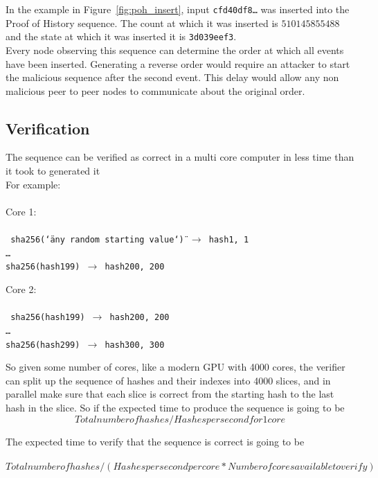 \documentclass[12pt]{article}
\begin{document}
  In the example in Figure~\ref{fig:poh_insert}, input \texttt{cfd40df8\ldots} was inserted into the Proof of History sequence. The count at which it was inserted is $510145855488$ and the state at which it was inserted it is \texttt{3d039eef3}.\\

Every node observing this sequence can determine the order at which all events have been inserted. Generating a reverse order would require an attacker to start the malicious sequence after the second event. This delay would allow any non malicious peer to peer nodes to communicate about the original order.\\

\subsection{Verification}
The sequence can be verified as correct in a multi core computer in less time than it took to generated it \\

\noindent For example: \\\\\noindent
\noindent Core 1: \\\\\noindent
\texttt{
sha256(\char`\"any random starting value\char`\") $\rightarrow$ hash1, 1\\
\ldots\\
sha256(hash199) $\rightarrow$ hash200, 200\\
}

\noindent Core 2: \\\\\noindent
\texttt{
sha256(hash199) $\rightarrow$ hash200, 200\\
\ldots\\
sha256(hash299) $\rightarrow$ hash300, 300\\
}

So given some number of cores, like a modern GPU with 4000 cores, the verifier can split up the sequence of hashes and their indexes into 4000 slices, and in parallel make sure that each slice is correct from the starting hash to the last hash in the slice.  So if the expected time to produce the sequence is going to be\\
\[Total number of hashes/Hashes per second for 1 core\]

\noindent The expected time to verify that the sequence is correct is going to be \\\\\noindent
\[Total number of hashes/(Hashes per second per core * Number of cores available to verify)\]
\end{document}
